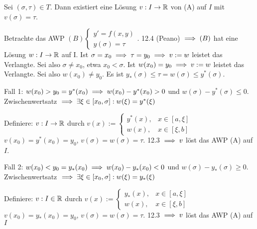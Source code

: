 \documentclass{article}
\begin{document}
\begin{satz} %
Sei $(\sigma, \tau) \in T$. Dann existiert eine Lösung $v: I \to \mathbb{R}$ von (A) auf $I$ mit $v(\sigma) = \tau$.
\end{satz}

\begin{beweis}
Betrachte das AWP $ (B) \begin{cases} y' =f(x,y) \\ y(\sigma) = \tau  \end{cases}.$
12.4 (Peano) $\implies (B)$ hat eine  Lösung $ w: I \to \mathbb{R}$ auf I. 
Ist $\sigma = x_0 \implies \tau = y_0 \implies v := w$ leistet das Verlangte. Sei also $\sigma \neq x_0$, etwa $x_0 < \sigma$.
Ist $w(x_0) = y_0 \implies v := w$ leistet das Verlangte. Sei also $w(x_0) \neq y_0$.
Es ist $y_*(\sigma)  \leq \tau = w(\sigma) \leq y^*(\sigma)$.

Fall 1: $w(x_0) > y_0 = y^*(x_0) \implies w(x_0) - y^*(x_0) > 0$ und $w(\sigma) - y^*(\sigma) \leq 0$.
Zwischenwertsatz $\implies \exists \xi \in [x_0, \sigma] : w(\xi) = y^*(\xi)$

Definiere: $v:I \to \mathbb{R}$ durch $ v(x) := \begin{cases} y^*(x),& x \in [a, \xi] \\ w(x),& x \in [\xi, b] \end{cases}$
$v(x_0) = y^*(x_0) = y_0$, $v(\sigma) = w(\sigma) = \tau.$ 12.3 $\implies v$ löst das AWP (A) auf $I$.


Fall 2: $w(x_0) < y_0 = y_*(x_0) \implies w(x_0) - y_*(x_0) < 0$ und $w(\sigma) - y_*(\sigma) \geq 0$.
Zwischenwertsatz $\implies \exists \xi \in [x_0, \sigma] : w(\xi) = y_*(\xi)$

Definiere: $v:I \in \mathbb{R}$ durch $v(x) := \begin{cases} y_*(x),& x \in [a, \xi] \\ w(x),& x \in [\xi, b] \end{cases}$
$v(x_0) = y_*(x_0) = y_0$, $v(\sigma) = w(\sigma) = \tau.$ 12.3 $\implies v$ löst das AWP (A) auf $I$
\end{beweis}
\end{document}
